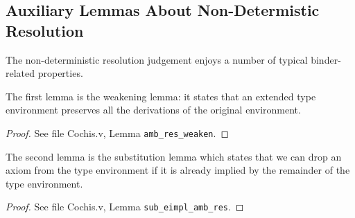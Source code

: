 \subsection{Auxiliary Lemmas About Non-Determistic Resolution}

The non-deterministic resolution judgement enjoys a number of
typical binder-related properties.

The first lemma is the weakening lemma: it states that an extended type environment
preserves all the derivations of the original environment.

{\centering
{}}
\begin{proof}
See file Cochis.v, Lemma \texttt{amb\_res\_weaken}.
\end{proof}
The second lemma is the substitution lemma which states that
we can drop an axiom from the type environment if it is already implied
by the remainder of the type environment.

{\centering
{}}
\begin{proof}
	See file Cochis.v, Lemma \texttt{sub\_eimpl\_amb\_res}.
\end{proof}


